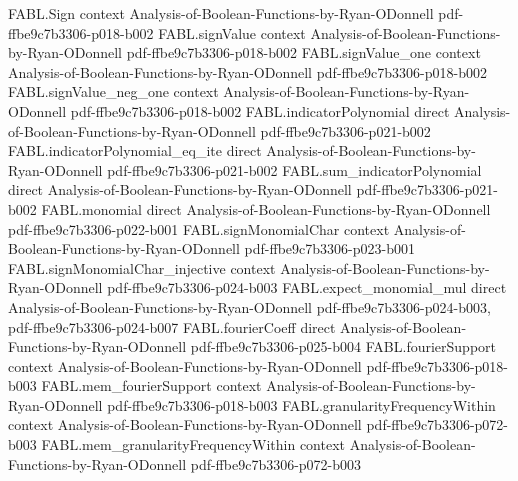 \begin{theorem}
\label{FABL.totalInfluence_toReal_mem_Icc}
\leanok
{}
\proofstep
  {FABL.Sign}
  {context}
  {Analysis-of-Boolean-Functions-by-Ryan-ODonnell}
  {pdf-ffbe9c7b3306-p018-b002}
\proofstep
  {FABL.signValue}
  {context}
  {Analysis-of-Boolean-Functions-by-Ryan-ODonnell}
  {pdf-ffbe9c7b3306-p018-b002}
\proofstep
  {FABL.signValue_one}
  {context}
  {Analysis-of-Boolean-Functions-by-Ryan-ODonnell}
  {pdf-ffbe9c7b3306-p018-b002}
\proofstep
  {FABL.signValue_neg_one}
  {context}
  {Analysis-of-Boolean-Functions-by-Ryan-ODonnell}
  {pdf-ffbe9c7b3306-p018-b002}
\proofstep
  {FABL.indicatorPolynomial}
  {direct}
  {Analysis-of-Boolean-Functions-by-Ryan-ODonnell}
  {pdf-ffbe9c7b3306-p021-b002}
\proofstep
  {FABL.indicatorPolynomial_eq_ite}
  {direct}
  {Analysis-of-Boolean-Functions-by-Ryan-ODonnell}
  {pdf-ffbe9c7b3306-p021-b002}
\proofstep
  {FABL.sum_indicatorPolynomial}
  {direct}
  {Analysis-of-Boolean-Functions-by-Ryan-ODonnell}
  {pdf-ffbe9c7b3306-p021-b002}
\proofstep
  {FABL.monomial}
  {direct}
  {Analysis-of-Boolean-Functions-by-Ryan-ODonnell}
  {pdf-ffbe9c7b3306-p022-b001}
\proofstep
  {FABL.signMonomialChar}
  {context}
  {Analysis-of-Boolean-Functions-by-Ryan-ODonnell}
  {pdf-ffbe9c7b3306-p023-b001}
\proofstep
  {FABL.signMonomialChar_injective}
  {context}
  {Analysis-of-Boolean-Functions-by-Ryan-ODonnell}
  {pdf-ffbe9c7b3306-p024-b003}
\proofstep
  {FABL.expect_monomial_mul}
  {direct}
  {Analysis-of-Boolean-Functions-by-Ryan-ODonnell}
  {pdf-ffbe9c7b3306-p024-b003,
    pdf-ffbe9c7b3306-p024-b007}
\proofstep
  {FABL.fourierCoeff}
  {direct}
  {Analysis-of-Boolean-Functions-by-Ryan-ODonnell}
  {pdf-ffbe9c7b3306-p025-b004}
\proofstep
  {FABL.fourierSupport}
  {context}
  {Analysis-of-Boolean-Functions-by-Ryan-ODonnell}
  {pdf-ffbe9c7b3306-p018-b003}
\proofstep
  {FABL.mem_fourierSupport}
  {context}
  {Analysis-of-Boolean-Functions-by-Ryan-ODonnell}
  {pdf-ffbe9c7b3306-p018-b003}
\proofstep
  {FABL.granularityFrequencyWithin}
  {context}
  {Analysis-of-Boolean-Functions-by-Ryan-ODonnell}
  {pdf-ffbe9c7b3306-p072-b003}
\proofstep
  {FABL.mem_granularityFrequencyWithin}
  {context}
  {Analysis-of-Boolean-Functions-by-Ryan-ODonnell}
  {pdf-ffbe9c7b3306-p072-b003}

\end{theorem}
